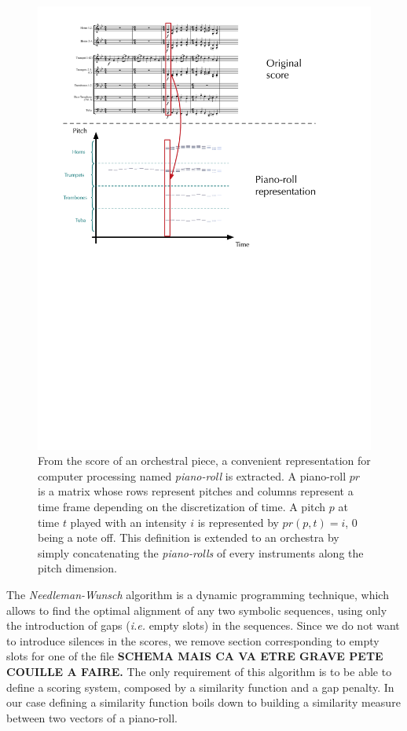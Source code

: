 \documentclass[twoside,twocolumn]{article}
\begin{document}
\begin{figure}[ht]
\centering
\includegraphics[scale=0.35]{Data_representation/from_score_to_pianoroll}
\caption{From the score of an orchestral piece, a convenient representation for computer processing named \textit{piano-roll} is extracted. A piano-roll $pr$ is a matrix whose rows represent pitches and columns represent a time frame depending on the discretization of time. A pitch $p$ at time $t$ played with an intensity $i$ is represented by $pr(p,t) = i$, $0$ being a note off. This definition is extended to an orchestra by simply concatenating the \textit{piano-rolls} of every instruments along the pitch dimension.}
\label{fig:pianoroll}
\end{figure}

The \textit{Needleman-Wunsch}  algorithm \cite{NEEDLEMAN1970443} is a dynamic programming technique, which allows to find the optimal alignment of any two symbolic sequences, using only the introduction of gaps (\textit{i.e.} empty slots) in the sequences. Since we do not want to introduce silences in the scores, we remove section corresponding to empty slots for one of the file \textbf{SCHEMA MAIS CA VA ETRE GRAVE PETE COUILLE A FAIRE.}
The only requirement of this algorithm is to be able to define a scoring system, composed by a similarity function and a gap penalty. In our case defining a similarity function boils down to building a similarity measure between two vectors of a piano-roll.
\end{document}
